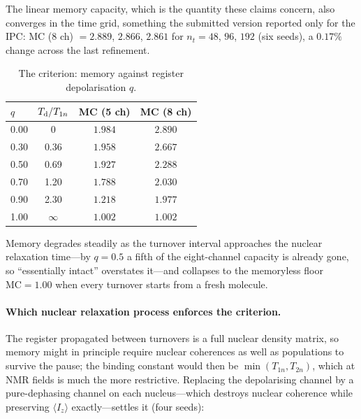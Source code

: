 \documentclass[aps,prx,reprint,superscriptaddress,nofootinbib,floatfix]{revtex4-2}
\begin{document}
The linear memory capacity, which is the quantity these claims concern, also
converges in the time grid, something the submitted version reported only for the
IPC: $\mathrm{MC}$ (8 ch) $=2.889$, $2.866$, $2.861$ for $n_t=48$, $96$, $192$
(six seeds), a $0.17\%$ change across the last refinement.

\begin{table}[H]
\caption{\label{tab:reuse}The criterion: memory against register depolarisation $q$.}
\begin{ruledtabular}
\begin{tabular}{lccc}
$q$ & $T_{\rm d}/T_{1n}$ & MC (5 ch) & MC (8 ch) \\
\hline
0.00 & 0 & $1.984$ & $2.890$ \\
0.30 & 0.36 & $1.958$ & $2.667$ \\
0.50 & 0.69 & $1.927$ & $2.288$ \\
0.70 & 1.20 & $1.788$ & $2.030$ \\
0.90 & 2.30 & $1.218$ & $1.977$ \\
1.00 & $\infty$ & $1.002$ & $1.002$ \\
\end{tabular}
\end{ruledtabular}
\end{table}

Memory degrades steadily as the turnover interval approaches the nuclear relaxation
time---by $q=0.5$ a fifth of the eight-channel capacity is already gone, so
``essentially intact'' overstates it---and collapses to the memoryless floor
$\mathrm{MC}=1.00$ when every turnover starts from a fresh molecule.

\paragraph*{Which nuclear relaxation process enforces the criterion.} The register
propagated between turnovers is a full nuclear density matrix, so memory might in
principle require nuclear coherences as well as populations to survive the pause;
the binding constant would then be $\min(T_{1n},T_{2n})$, which at NMR fields is
much the more restrictive. Replacing the depolarising channel by a pure-dephasing channel on
each nucleus---which destroys nuclear coherence while preserving
$\langle I_z\rangle$ exactly---settles it (four seeds):
\end{document}
